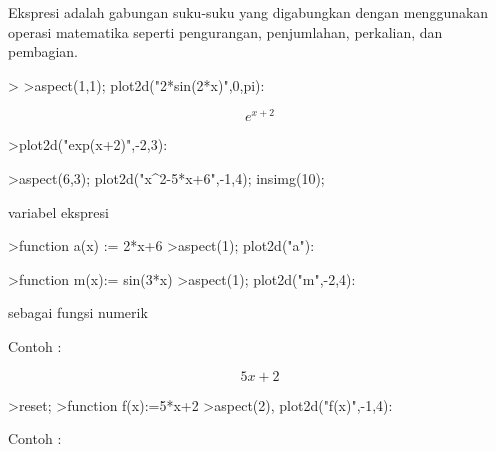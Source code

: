 \documentclass[a4paper,10pt]{article}
\begin{document}
\begin{eulernotebook}
\begin{eulercomment}
\begin{eulercomment}
\begin{eulercomment}
\begin{eulercomment}
\begin{eulercomment}
Ekspresi adalah gabungan suku-suku yang digabungkan dengan menggunakan
operasi matematika seperti pengurangan, penjumlahan, perkalian, dan
pembagian.
\end{eulercomment}
\begin{eulerprompt}
>                  
>aspect(1,1); plot2d("2*sin(2*x)",0,pi):
\end{eulerprompt}
\begin{eulerformula}
\[
e^{x+2}
\]
\end{eulerformula}
\begin{eulerprompt}
>plot2d("exp(x+2)",-2,3):
\end{eulerprompt}
\begin{eulerprompt}
>aspect(6,3); plot2d("x^2-5*x+6",-1,4); insimg(10);
\end{eulerprompt}
\begin{eulercomment}
variabel ekspresi

\end{eulercomment}
\begin{eulerprompt}
>function a(x) := 2*x+6
>aspect(1); plot2d("a"):
\end{eulerprompt}
\begin{eulerprompt}
>function m(x):= sin(3*x)
>aspect(1); plot2d("m",-2,4):
\end{eulerprompt}
\begin{eulercomment}
sebagai fungsi numerik

Contoh :

\end{eulercomment}
\begin{eulerformula}
\[
 5x + 2
\]
\end{eulerformula}
\begin{eulerprompt}
>reset;
>function f(x):=5*x+2
>aspect(2), plot2d("f(x)",-1,4):
\end{eulerprompt}
\begin{eulercomment}
Contoh :


\end{eulercomment}
\end{eulercomment}
\end{eulercomment}
\end{eulercomment}
\end{eulercomment}
\end{eulernotebook}
\end{document}

